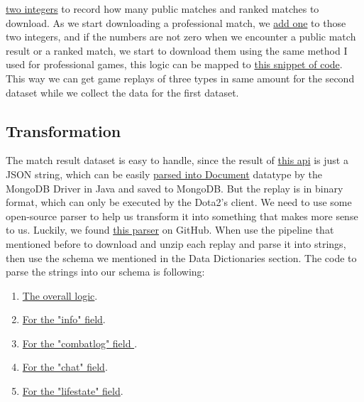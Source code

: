 \documentclass{article}
\begin{document}
\href{https://github.com/Vopaaz/big-data-psg-lgd/blob/a9a285e0e29c0d9e56b41994875df830c7e7b51b/src/main/java/FetchStore/ValveAPI.java#L46-L47}{two integers} to record how many public matches and ranked matches to download. As we start downloading a professional match, we \href{https://github.com/Vopaaz/big-data-psg-lgd/blob/a9a285e0e29c0d9e56b41994875df830c7e7b51b/src/main/java/FetchStore/ValveAPI.java#L111-L112}{add one} to those two integers, and if the numbers are not zero when we encounter a public match result or a ranked match, we start to download them using the same method I used for professional games, this logic can be mapped to \href{https://github.com/Vopaaz/big-data-psg-lgd/blob/a9a285e0e29c0d9e56b41994875df830c7e7b51b/src/main/java/FetchStore/ValveAPI.java#L104-L129}{this snippet of code}. This way we can get game replays of three types in same amount for the second dataset while we collect the data for the first dataset.
\subsection{Transformation}
    The match result dataset is easy to handle, since the result of  \href{https://wiki.teamfortress.com/wiki/WebAPI/GetMatchHistoryBySequenceNum}{this api} is just a JSON string, which can be easily \href{https://github.com/Vopaaz/big-data-psg-lgd/blob/9916e0a5a95245062d110446eb4014312087ef9e/src/main/java/FetchStore/ValveAPI.java#L164-L178}{parsed into Document} datatype by the MongoDB Driver in Java and saved to MongoDB. But the replay is in binary format, which can only be executed by the Dota2's client. We need to use some open-source parser to help us transform it into something that makes more sense to us. Luckily, we found \href{https://github.com/skadistats/clarity}{this parser} on GitHub. When use the pipeline that mentioned before to download and unzip each replay and parse it into strings, then use the schema we mentioned in the Data Dictionaries section. The code to parse the strings into our schema is following:
\begin{enumerate}
\item \href{https://github.com/Vopaaz/big-data-psg-lgd/blob/master/src/main/java/ParseReplay/ParseReplayExecutor.java}{The overall logic}.
\item \href{https://github.com/Vopaaz/big-data-psg-lgd/blob/master/src/main/java/ParseReplay/Info.java}{For the "info" field}.
\item \href{https://github.com/Vopaaz/big-data-psg-lgd/blob/master/src/main/java/ParseReplay/Combatlog.java}{For the "combatlog" field }.
\item \href{https://github.com/Vopaaz/big-data-psg-lgd/blob/master/src/main/java/ParseReplay/Chat.java}{For the "chat" field}.
\item \href{https://github.com/Vopaaz/big-data-psg-lgd/blob/master/src/main/java/ParseReplay/Lifestate.java}{For the "lifestate" field}.
\end{enumerate}
\end{document}

